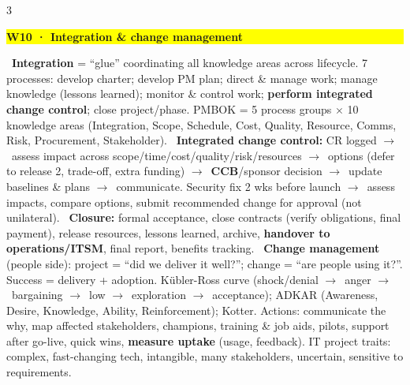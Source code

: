 \documentclass[a4paper,landscape]{article}
\newcommand{\hlhighlight}[1]{\begingroup\setlength{\fboxsep}{0pt}\colorbox{yellow}{\strut\textbf{#1}}\endgroup}
\newcommand{\concept}[1]{\textbf{#1}}
\newcommand{\lbl}[1]{\textbf{#1}}
\newcommand{\kh}[1]{{\setlength{\fboxsep}{0.5pt}\colorbox{keyhlcolor}{#1}}}
\newcommand{\ra}{$\rightarrow$}
\begin{document}
\begin{multicols}{3}
\par\smallskip\noindent\hlhighlight{W10 · Integration \& change management}\ \concept{Integration} = ``glue'' coordinating all knowledge areas across lifecycle. \kh{7 processes:} develop charter; develop PM plan; direct \& manage work; manage knowledge (lessons learned); monitor \& control work; \lbl{perform integrated change control}; close project/phase. PMBOK = 5 process groups $\times$ 10 knowledge areas (Integration, Scope, Schedule, Cost, Quality, Resource, Comms, Risk, Procurement, Stakeholder). \textbullet\ \concept{Integrated change control:} CR logged \ra\ assess impact across scope/time/cost/quality/risk/resources \ra\ options (defer to release 2, trade-off, extra funding) \ra\ \lbl{CCB}/sponsor decision \ra\ update baselines \& plans \ra\ communicate. Security fix 2 wks before launch \ra\ \kh{assess impacts, compare options,} \kh{submit recommended change for approval} (not unilateral). \textbullet\ \concept{Closure:} formal acceptance, close contracts (verify obligations, final payment), release resources, lessons learned, archive, \lbl{handover to operations/ITSM}, final report, benefits tracking. \textbullet\ \concept{Change management} (people side): project = ``did we deliver it well?''; change = ``\kh{are people using it?}''. Success = delivery + adoption. Kübler-Ross curve (shock/denial \ra\ anger \ra\ bargaining \ra\ low \ra\ exploration \ra\ acceptance); ADKAR (Awareness, Desire, Knowledge, Ability, Reinforcement); Kotter. Actions: communicate the why, map affected stakeholders, champions, training \& job aids, pilots, support after go-live, quick wins, \lbl{measure uptake} (usage, feedback). IT project traits: complex, fast-changing tech, intangible, many stakeholders, uncertain, sensitive to requirements.\par


\end{multicols}
\end{document}
